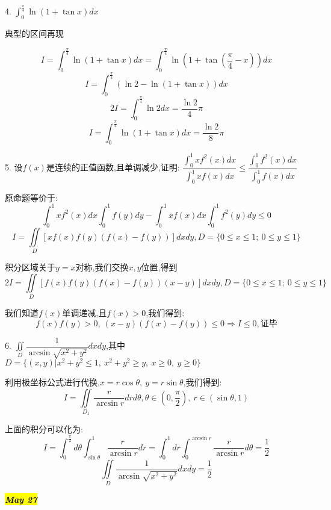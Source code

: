 
4. $\int_{0}^{\frac{\pi}{4}}\ln(1+\tan x)dx$ \label{problem: 区间再现}
\begin{solution}
	
	典型的区间再现
	
	$$I=\int_{0}^{\frac{\pi}{4}}\ln(1+\tan x)dx=\int_{0}^{\frac{\pi}{4}}\ln(1+\tan(\frac{\pi}{4}-x))dx$$
	$$I=\int_{0}^{\frac{\pi}{4}}(\ln2-\ln(1+\tan x))dx$$
	$$2I=\int_{0}^{\frac{\pi}{4}}\ln 2dx=\frac{\ln 2}{4}\pi$$
	$$I=\int_{0}^{\frac{\pi}{4}}\ln(1+\tan x)dx=\frac{\ln 2}{8}\pi$$
\end{solution}


5. 设$f(x)$是连续的正值函数,且单调减少,证明: $\dfrac{\int_{0}^{1}xf^{2}(x)dx}{\int_{0}^{1}xf(x)dx}\leq \dfrac{\int_{0}^{1}f^{2}(x)dx}{\int_{0}^{1}f(x)dx}$
\begin{solution}
	
	原命题等价于: 
	$$\int_{0}^{1}xf^{2}(x)dx\int_{0}^{1}f(y)dy-\int_{0}^{1}xf(x)dx\int_{0}^{1}f^{2}(y)dy\leq 0$$
	$$I=\iint\limits_{D}[xf(x)f(y)(f(x)-f(y))]dxdy,D=\{0\leq x\leq 1;\ 0\leq y\leq 1 \}$$
	
	积分区域关于$y=x$对称,我们交换$x,y$位置,得到
	$$2I=\iint\limits_{D}[f(x)f(y)(f(x)-f(y))(x-y)]dxdy,D=\{0\leq x\leq 1;\ 0\leq y\leq 1 \}$$
	
	我们知道$f(x)$单调递减,且$f(x)>0$,我们得到: 
	$$f(x)f(y)>0,\ (x-y)(f(x)-f(y))\leq 0\Rightarrow I\leq 0,\text{证毕}$$
\end{solution}


6. $\iint\limits_{D}\dfrac{1}{\arcsin\sqrt{x^2+y^2}}dxdy$,其中$D=\{(x,y)|x^2+y^2\leq 1,\ x^2+y^2\geq y,\ x\geq 0,\ y\geq 0\}$
\begin{solution}
	
	利用极坐标公式进行代换,$x=r\cos \theta,\ y=r\sin \theta$,我们得到: 
	$$I=\iint\limits_{D_{1}}\dfrac{r}{\arcsin r}drd\theta,\theta\in(0,\frac{\pi}{2}),\ r\in(\sin\theta,1)$$
	
	上面的积分可以化为: 
	$$I=\int_{0}^{\frac{\pi}{2}}d\theta\int_{\sin\theta}^{1}\dfrac{r}{\arcsin r}dr=\int_{0}^{1}dr\int_{0}^{\arcsin r}\frac{r}{\arcsin r}d\theta=\frac{1}{2}$$
	$$\iint\limits_{D}\dfrac{1}{\arcsin\sqrt{x^2+y^2}}dxdy=\frac{1}{2}$$
\end{solution}


\hl{\textbf{\textit{May 27}}}


